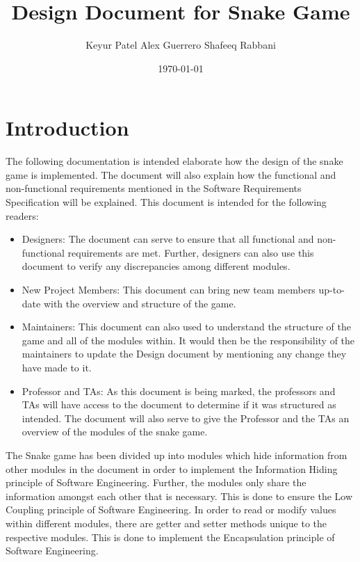 \documentclass[12pt]{article}
\begin{document}
\title{Design Document for Snake Game} 
\author{Keyur Patel
Alex Guerrero
Shafeeq Rabbani}
\date{\today}
	
\maketitle

\tableofcontents

\newpage

\section{Introduction}

The following documentation is intended elaborate how the design of the snake game is implemented. The document will also explain how the functional and non-functional requirements mentioned in the Software Requirements Specification will be explained. This document is intended for the following readers:

\begin{itemize}
\item Designers: The document can serve to ensure that all functional and non-functional requirements are met. Further, designers can also use this document to verify any discrepancies among different modules.

\item New Project Members: This document can bring new team members up-to-date with the overview and structure of the game.

\item Maintainers: This document can also used to understand the structure of the game and all of the modules within. It would then be the responsibility of the maintainers to update the Design document by mentioning any change they have made to it.

\item Professor and TAs: As this document is being marked, the professors and TAs will have access to the document to determine if it was structured as intended. The document will also serve to give the Professor and the TAs an overview of the modules of the snake game.
\end{itemize}

The Snake game has been divided up into modules which hide information from other modules in the document in order to implement the Information Hiding principle of Software Engineering. Further, the modules only share the information amongst each other that is necessary. This is done to ensure the Low Coupling principle of Software Engineering. In order to read or modify values within different modules, there are getter and setter methods unique to the respective modules. This is done to implement the Encapsulation principle of Software Engineering.
\end{document}
